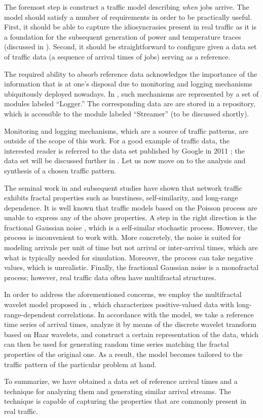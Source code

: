 The foremost step is construct a traffic model describing \emph{when} jobs
arrive. The model should satisfy a number of requirements in order to be
practically useful. First, it should be able to capture the idiosyncrasies
present in real traffic as it is a foundation for the subsequent generation of
power and temperature traces (discussed in ). Second, it
should be straightforward to configure given a data set of traffic data (a
sequence of arrival times of jobs) serving as a reference.

The required ability to absorb reference data acknowledges the importance of the
information that is at one's disposal due to monitoring and logging mechanisms
ubiquitously deployed nowadays. In , such mechanisms are
represented by a set of modules labeled ``Logger.'' The corresponding data are
are stored in a repository, which is accessible to the module labeled
``Streamer'' (to be discussed shortly).

Monitoring and logging mechanisms, which are a source of traffic patterns, are
outside of the scope of this work. For a good example of traffic data, the
interested reader is referred to the data set published by Google in 2011
\cite{google}; the data set will be discussed further in . Let us
now move on to the analysis and synthesis of a chosen traffic pattern.

The seminal work in \cite{leland1994} and subsequent studies have shown that
network traffic exhibits fractal properties such as burstiness, self-similarity,
and long-range dependence. It is well known that traffic models based on the
Poisson process \cite{lifshits2014} are unable to express any of the above
properties. A step in the right direction is the fractional Gaussian noise
\cite{lifshits2014}, which is a self-similar stochastic process. However, the
process is inconvenient to work with. More concretely, the noise is suited for
modeling arrivals per unit of time but not arrival or inter-arrival times, which
are what is typically needed for simulation. Moreover, the process can take
negative values, which is unrealistic. Finally, the fractional Gaussian noise is
a monofractal process; however, real traffic data often have multifractal
structures.

In order to address the aforementioned concerns, we employ the multifractal
wavelet model proposed in \cite{riedi1999}, which characterizes positive-valued
data with long-range-dependent correlations. In accordance with the model, we
take a reference time series of arrival times, analyze it by means of the
discrete wavelet transform based on Haar wavelets, and construct a certain
representation of the data, which can then be used for generating random time
series matching the fractal properties of the original one. As a result, the
model becomes tailored to the traffic pattern of the particular problem at hand.

To summarize, we have obtained a data set of reference arrival times and a
technique for analyzing them and generating similar arrival streams. The
technique is capable of capturing the properties that are commonly present in
real traffic.

